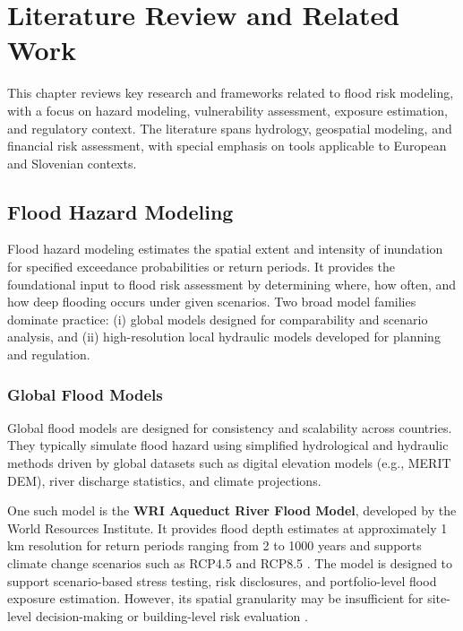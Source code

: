 \chapter{Literature Review and Related Work}
\label{chap:literature-review-and-related-work}

This chapter reviews key research and frameworks related to flood risk modeling, with a focus on hazard modeling, vulnerability assessment, exposure estimation, and regulatory context. The literature spans hydrology, geospatial modeling, and financial risk assessment, with special emphasis on tools applicable to European and Slovenian contexts.

\section{Flood Hazard Modeling}
Flood hazard modeling estimates the spatial extent and intensity of inundation for specified exceedance probabilities or return periods. It provides the foundational input to flood risk assessment by determining where, how often, and how deep flooding occurs under given scenarios. Two broad model families dominate practice: (i) global models designed for comparability and scenario analysis, and (ii) high-resolution local hydraulic models developed for planning and regulation.

\subsection{Global Flood Models}
Global flood models are designed for consistency and scalability across countries. They typically simulate flood hazard using simplified hydrological and hydraulic methods driven by global datasets such as digital elevation models (e.g., MERIT DEM), river discharge statistics, and climate projections.

One such model is the \textbf{WRI Aqueduct River Flood Model}, developed by the World Resources Institute. It provides flood depth estimates at approximately 1 km resolution for return periods ranging from 2 to 1000 years and supports climate change scenarios such as RCP4.5 and RCP8.5 \cite{wri_aqueduct_floods, ward_aqueduct_2020, kuzma_aqueduct_2023}. The model is designed to support scenario-based stress testing, risk disclosures, and portfolio-level flood exposure estimation. However, its spatial granularity may be insufficient for site-level decision-making or building-level risk evaluation \cite{woetzel2020climate, ipcc2021}.


